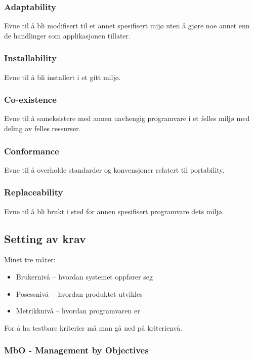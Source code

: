 \subsubsection{Adaptability}

Evne til å bli modifisert til et annet spesifisert mijø uten å gjøre noe
annet enn de handlinger som applikasjonen tillater.

\subsubsection{Installability}

Evne til å bli installert i et gitt miljø.

\subsubsection{Co-existence}

Evne til å sameksistere med annen uavhengig programvare i et felles
miljø med deling av felles ressurser.

\subsubsection{Conformance}

Evne til å overholde standarder og konvensjoner relatert til
portability.

\subsubsection{Replaceability}

Evne til å bli brukt i sted for annen spesifisert programvare dets
miljø.

\subsection{Setting av krav}

Minst tre måter:

\begin{itemize}
\item
  Brukernivå -- hvordan systemet oppfører seg
\item
  Posessnivå~-- hvordan produktet utvikles
\item
  Metrikknivå -- hvordan programvaren er
\end{itemize}
For å ha testbare kriterier må man gå ned på kriterienvå.

\subsubsection{MbO - Management by Objectives}

